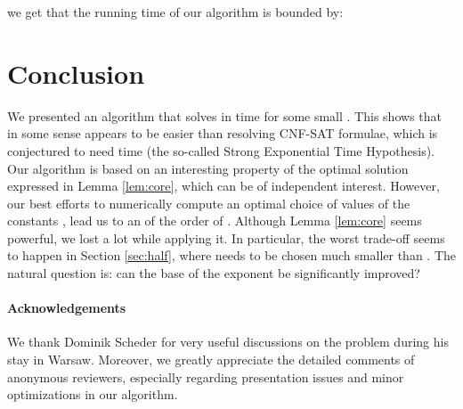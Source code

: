 \documentclass{article}
\theoremstyle{definition}
\begin{document}
we get that the running time of our algorithm is bounded by:



\section{Conclusion}\label{sec:conc}

We presented an algorithm that solves \schedname{} in  time for some small .
This shows that in some sense \schedname{} appears to be easier than resolving CNF-SAT formulae, which is conjectured to need  time (the so-called Strong Exponential Time Hypothesis).
Our algorithm is based on an interesting property of the optimal solution expressed in Lemma \ref{lem:core}, which can be of independent interest.
However, our best efforts to numerically compute an optimal choice of values of the constants ,  lead us
to an  of the order of . Although Lemma \ref{lem:core} seems powerful, we lost a lot while applying it. In particular,
the worst trade-off seems to happen in Section \ref{sec:half}, where  needs to be chosen much smaller than .
The natural question is: can the base of the exponent be significantly improved?

\paragraph{Acknowledgements} We thank Dominik Scheder for very useful discussions on the \schedname{} problem during his stay in Warsaw. 
Moreover, we greatly appreciate the detailed comments of anonymous reviewers, especially regarding presentation issues and minor optimizations in our algorithm.



\end{document}
